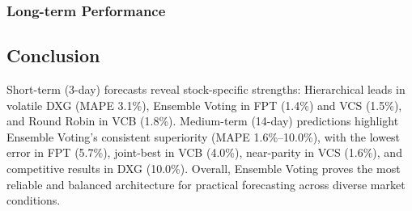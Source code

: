 \documentclass{ieeeaccess}
\begin{document}
\subsubsection{Long-term Performance}
\begin{table}[!h]
\centering
\caption{Long-term Performance of Prediction Architectures Across Stocks (LLM: Google Gemini 2.0 Flash)}
\end{table}

\subsection{Conclusion}
Short-term (3-day) forecasts reveal stock-specific strengths: Hierarchical leads in volatile DXG (MAPE 3.1\%), Ensemble Voting in FPT (1.4\%) and VCS (1.5\%), and Round Robin in VCB (1.8\%). Medium-term (14-day) predictions highlight Ensemble Voting's consistent superiority (MAPE 1.6\%–10.0\%), with the lowest error in FPT (5.7\%), joint-best in VCB (4.0\%), near-parity in VCS (1.6\%), and competitive results in DXG (10.0\%). Overall, Ensemble Voting proves the most reliable and balanced architecture for practical forecasting across diverse market conditions.
\end{document}
